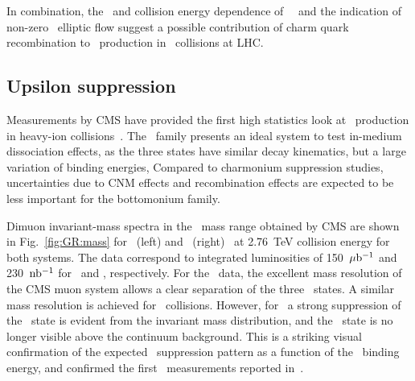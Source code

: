 In combination, the \pT\ and collision energy dependence of \jpsi\  \Raa\ and
the indication of non-zero \jpsi\ elliptic flow suggest a possible
contribution of charm quark recombination to \jpsi\ production in \PbPb\ collisions
at LHC.

\subsection{Upsilon suppression}

Measurements by CMS have provided the first high statistics look at \PgU\
production in heavy-ion collisions~\cite{CMS_Y_2010}.
The \PgU\ family presents an ideal system to test in-medium dissociation effects,
as the three states have similar decay kinematics, but a large variation of binding energies,
Compared to charmonium suppression studies, uncertainties due
to CNM effects and recombination effects are expected to be
less important for the bottomonium family.

Dimuon invariant-mass spectra in the \PgU\ mass range obtained by CMS are shown in
Fig.~\ref{fig:GR:mass} for \PbPb\ (left) and \pp\ (right)~\cite{Chatrchyan:2012lxa}
at 2.76~TeV collision energy for both systems.
The data correspond to integrated luminosities of 150~$\mathrm{\mu b^{-1}}$ and 230~$\mathrm{nb^{-1}}$ for
\PbPb\ and \pp, respectively. For the \pp\ data, the excellent mass resolution of the CMS muon system
allows a clear separation of the three \PgUn\ states. A similar mass resolution is achieved
for \PbPb\ collisions.
However, for \PbPb\ a strong suppression of the \PgUb\ state is evident from the
invariant mass distribution, and the \PgUc\ state is no longer visible above the continuum background.
This is a striking visual confirmation of the expected
\PgU\ suppression pattern as a function of the \PgUn\ binding energy, and confirmed the
first \PgU\ measurements reported in~\cite{CMS_Y_2010}.

